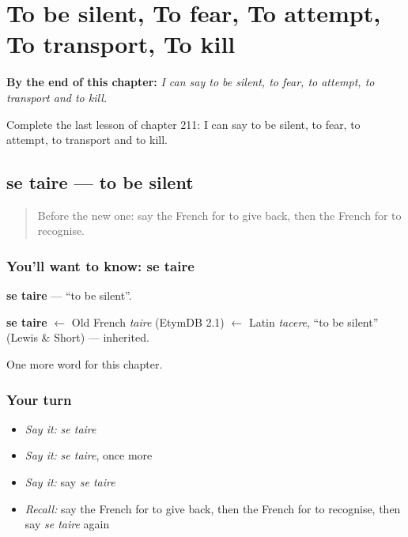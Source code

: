 
\chapter{To be silent, To fear, To attempt, To transport, To kill}
\label{ch:fr-to-be-silent-to-fear-to-attempt-to-transport-to-kill}

\begin{chapteropening}
\textbf{By the end of this chapter:} \emph{I can say to be silent, to fear, to attempt, to transport and to kill.}

Complete the last lesson of chapter 211: I can say to be silent, to fear, to attempt, to transport and to kill.
\end{chapteropening}

\section[se taire]{se taire — to be silent}

\label{lesson:FR-C211-taire}



\begin{quote}
Before the new one: say the French for to give back, then the French for to recognise.
\end{quote}

\subsection*{You'll want to know: se taire}
\textbf{se taire} — \textquotedblleft{}to be silent\textquotedblright{}.

\begin{cousinweb}
\textbf{se taire} $\leftarrow$ Old French \emph{taire} (EtymDB 2.1) $\leftarrow$ Latin \emph{tacere}, \textquotedblleft{}to be silent\textquotedblright{} (Lewis \& Short) — inherited.
\end{cousinweb}

\begin{grammarlens}[title={What you've built}]
One more word for this chapter.
\end{grammarlens}

\subsection*{Your turn}
\begin{itemize}
\raggedright
  \item \emph{Say it:} \emph{se taire}
  \item \emph{Say it:} \emph{se taire}, once more
  \item \emph{Say it:} say \emph{se taire}
  \item \emph{Recall:} say the French for to give back, then the French for to recognise, then say \emph{se taire} again
\end{itemize}

